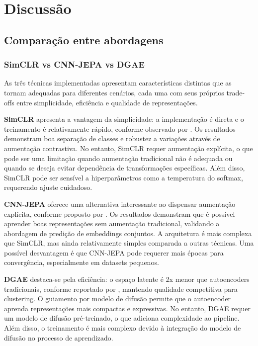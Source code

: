 \chapter{Discussão}

\section{Comparação entre abordagens}

\subsection{SimCLR vs CNN-JEPA vs DGAE}

As três técnicas implementadas apresentam características distintas que as tornam adequadas para diferentes cenários, cada uma com seus próprios trade-offs entre simplicidade, eficiência e qualidade de representações.

\textbf{SimCLR} apresenta a vantagem da simplicidade: a implementação é direta e o treinamento é relativamente rápido, conforme observado por \cite{chen2020simclr}. Os resultados demonstram boa separação de classes e robustez a variações através de aumentação contrastiva. No entanto, SimCLR requer aumentação explícita, o que pode ser uma limitação quando aumentação tradicional não é adequada ou quando se deseja evitar dependência de transformações específicas. Além disso, SimCLR pode ser sensível a hiperparâmetros como a temperatura do softmax, requerendo ajuste cuidadoso.

\textbf{CNN-JEPA} oferece uma alternativa interessante ao dispensar aumentação explícita, conforme proposto por \cite{kalapos2025cnnjepa}. Os resultados demonstram que é possível aprender boas representações sem aumentação tradicional, validando a abordagem de predição de embeddings conjuntos. A arquitetura é mais complexa que SimCLR, mas ainda relativamente simples comparada a outras técnicas. Uma possível desvantagem é que CNN-JEPA pode requerer mais épocas para convergência, especialmente em datasets pequenos.

\textbf{DGAE} destaca-se pela eficiência: o espaço latente é 2x menor que autoencoders tradicionais, conforme reportado por \cite{liu2025dgae}, mantendo qualidade competitiva para clustering. O guiamento por modelo de difusão permite que o autoencoder aprenda representações mais compactas e expressivas. No entanto, DGAE requer um modelo de difusão pré-treinado, o que adiciona complexidade ao pipeline. Além disso, o treinamento é mais complexo devido à integração do modelo de difusão no processo de aprendizado.

